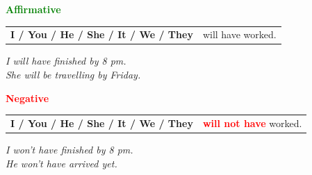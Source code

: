 \documentclass[a4paper,10pt]{article}
\newcommand{\sectiontitle}[2]{%
  {\large\bfseries\textcolor{#1}{#2}}%
}
\begin{document}
\begin{minipage}[t]{.485\textwidth}
\begin{greenbox}
  \sectiontitle{Green}{Affirmative}

  \vspace{0.75mm}
  \begin{tabular}{@{}>{\bfseries}l l@{}}
    I / You / He / She / It / We / They & will have worked.\\
    
  \end{tabular}

  \vspace{0.75mm}
  \textit{I will have finished by 8 pm.}\\[-1mm]
  \textit{She will be travelling by Friday.}
\end{greenbox}
\end{minipage}
\hfill
\begin{minipage}[t]{.485\textwidth}
\begin{redbox}
  \sectiontitle{Red}{Negative}

  \vspace{0.75mm}
  \begin{tabular}{@{}>{\bfseries}l l@{}}
    I / You / He / She / It / We / They & \textcolor{Red}{\bfseries will not have} worked.\\
    
  \end{tabular}

  \vspace{0.75mm}
  \textit{I won't have finished by 8 pm.}\\[-1mm]
  \textit{He won't have arrived yet.}
\end{redbox}
\end{minipage}

\vspace{1.35mm}
\end{document}
